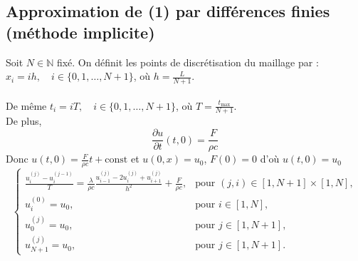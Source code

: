 \documentclass{article}
\begin{document}
\subsection{Approximation de (1) par différences finies (méthode implicite)}

Soit \( N \in \mathbb{N} \) fixé. On définit les points de discrétisation du maillage par :\\ \( x_i = ih, \quad i \in \{0, 1, \ldots, N + 1\} \), où \( h = \frac{L}{N + 1} \).\\ \\De même \( t_i = iT, \quad i \in \{0, 1, \ldots, N + 1\} \), où \( T = \frac{t_{\text{max}}}{N + 1} \).\\De plus,\\
\begin{equation}
\frac{\partial u}{\partial t}(t, 0) = \frac{F}{\rho c}
\end{equation}
Donc $u(t,0)=\frac{F}{\rho c}t + \text{const}$ et $u(0, x) = u_0$, $F(0)=0$ d'où $u(t,0)=u_0$
\begin{equation}
\begin{cases}
    \frac{u_i^{(j)} - u_i^{(j-1)}}{T} = \frac{\lambda}{\rho c} \frac{u_{i-1}^{(j)} - 2u_i^{(j)} + u_{i+1}^{(j)}}{h^2} + \frac{F}{\rho c}, & \text{pour } (j, i) \in [1, N+1] \times [1, N], \\
    u_i^{(0)} = u_0, & \text{pour } i \in [1, N], \\
    u_0^{(j)}=u_0, & \text{pour } j \in [1,N+1], \\
    u_{N+1}^{(j)} = u_0, & \text{pour } j \in [1,N+1].
\end{cases}
\end{equation}
\end{document}
